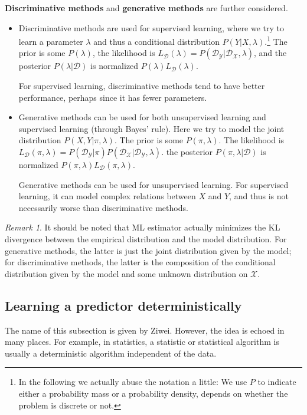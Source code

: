 \documentclass[openany]{book}
\theoremstyle{definition}
\theoremstyle{remark}
\newtheorem*{remark}{Remark}
\begin{document}
\textbf{Discriminative methods} and \textbf{generative methods} are further considered.
\begin{itemize}
    \item Discriminative methods are used for supervised learning, where we try to learn a parameter $\lambda$ and thus a conditional distribution $P(Y|X,\lambda)$.\footnote{In the following we actually abuse the notation a little: We use $P$ to indicate either a probability mass or a probability density, depends on whether the problem is discrete or not.} The prior is some $P(\lambda)$, the likelihood is $L_{\mathcal{D}}(\lambda)=P(\mathcal{D}_{\mathcal{Y}}|\mathcal{D}_{\mathcal{X}},\lambda)$, and the posterior $P(\lambda|\mathcal{D})$ is normalized $P(\lambda)L_{\mathcal{D}}(\lambda)$.

    For supervised learning, discriminative methods tend to have better performance, perhaps since it has fewer parameters.

    \item Generative methods can be used for both unsupervised learning and supervised learning (through Bayes' rule). Here we try to model the joint distribution $P(X,Y|\pi,\lambda)$. The prior is some $P(\pi,\lambda)$. The likelihood is $L_{\mathcal{D}}(\pi,\lambda)=P(\mathcal{D}_{\mathcal{Y}}|\pi)P(\mathcal{D}_{\mathcal{X}}|\mathcal{D}_{\mathcal{Y}},\lambda)$. the posterior $P(\pi,\lambda|\mathcal{D})$ is normalized $P(\pi,\lambda)L_{\mathcal{D}}(\pi,\lambda)$.

    Generative methods can be used for unsupervised learning. For supervised learning, it can model complex relations between $X$ and $Y$, and thus is not necessarily worse than discriminative methods.
\end{itemize}
\begin{remark}
    It should be noted that ML estimator actually minimizes the KL divergence between the empirical distribution and the model distribution. For generative methods, the latter is just the joint distribution given by the model; for discriminative methods, the latter is the composition of the conditional distribution given by the model and some unknown distribution on $\mathcal{X}$.
\end{remark}

\subsection{Learning a predictor deterministically}
The name of this subsection is given by Ziwei. However, the idea is echoed in many places. For example, in statistics, a statistic or statistical algorithm is usually a deterministic algorithm independent of the data.
\end{document}
